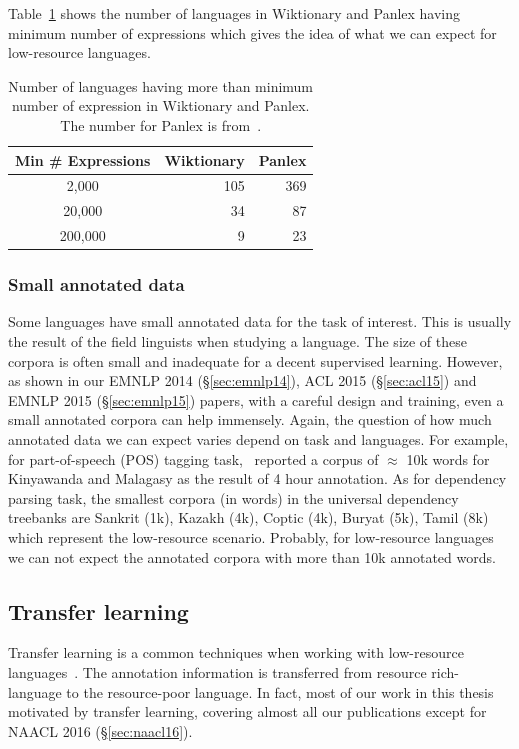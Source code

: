 \documentclass[12pt,twoside,final,hidelinks]{ltthesis}
\theoremstyle{definition}
\newcommand\emnlpiv{EMNLP 2014 (\S\ref{sec:emnlp14})}
\newcommand\aclv{ACL 2015 (\S\ref{sec:acl15})}
\newcommand\emnlpv{EMNLP 2015 (\S\ref{sec:emnlp15})}
\newcommand\naaclvi{NAACL 2016 (\S\ref{sec:naacl16})}
\begin{document}
Table~\ref{tab:expression_wik_pan} shows the number of languages in Wiktionary and Panlex 
having minimum number of expressions which gives the idea of what we can expect for low-resource languages. 
\begin{table}
\centering
\begin{tabular}{crr}
\toprule
Min \# Expressions & Wiktionary & Panlex \\
\midrule
2,000          & 105        & 369    \\
20,000         & 34         & 87     \\
200,000        & 9          & 23    \\
\bottomrule
\end{tabular}
\caption[Number of languages having more than minimum number of expression in Wiktionary and Panlex]{Number of languages having more than minimum number of expression in Wiktionary and Panlex. The number for Panlex is from~\protect{}.}
\label{tab:expression_wik_pan}
\end{table}


\subsubsection{Small annotated data}
Some languages have small annotated data for the task of interest. This is usually the result 
of the field linguists when studying a language. The size of these corpora is often small and 
inadequate for a decent supervised learning. However, as shown in our \emnlpiv{}, \aclv{} and 
\emnlpv{} papers, with a careful design and training, even a small annotated corpora can help immensely. Again, the question of how much annotated data we can expect varies depend on task and languages. For example, for part-of-speech (POS) tagging task,~ reported a corpus of $\approx$ 10k words for Kinyawanda and Malagasy as the result of 4 hour annotation. As for dependency parsing task, the smallest corpora (in words) in the universal dependency treebanks are Sankrit (1k), Kazakh (4k), Coptic (4k), Buryat (5k), Tamil (8k) which represent the low-resource scenario. Probably, for low-resource languages we can not expect the annotated corpora with more than 10k annotated words. 

\subsection{Transfer learning}
Transfer learning is a common techniques when working with low-resource 
languages~\cite{TackstromDPMN13,Das:2011,YarowskyAndNgai,duongIJCNLP,Hwa:2005:BPV,P14-1126}. The annotation information is transferred from resource rich-language to the resource-poor language. In fact, most of our work in this thesis motivated by transfer learning, covering almost all our publications except for \naaclvi. 
\end{document}
